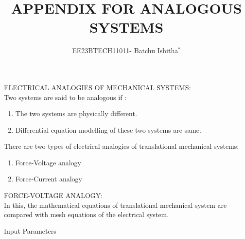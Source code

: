 \documentclass[journal,12pt,onecolumn]{IEEEtran}
\theoremstyle{remark}
\begin{document}
\newcommand\tabref{Table~\ref}
\newcommand{\sinc}{\,\text{sinc}\,}
\newcommand{\rect}{\,\text{rect}\,}

\let\vec\mathbf



\title{ APPENDIX FOR ANALOGOUS SYSTEMS}
\author{EE23BTECH11011- Batchu Ishitha$^{*}$%
}
\maketitle




\bigskip

\renewcommand{\thefigure}{\theenumi}
\renewcommand{\thetable}{\theenumi}

ELECTRICAL ANALOGIES OF MECHANICAL SYSTEMS:\\

Two systems are said to be analogous if :
\begin{enumerate}
\item The two systems are physically different.
\item Differential equation modelling of these two systems are same.
\end{enumerate} 


There are two types of electrical analogies of translational mechanical systems:
\begin{enumerate}
\item Force-Voltage analogy
\item Force-Current analogy
\end{enumerate} 

FORCE-VOLTAGE ANALOGY:\\
In this, the mathematical equations of translational mechanical system are compared with mesh equations of the electrical system.


\begin{table}[!ht]    
    \centering
      
      \caption{Input Parameters}
    \label{table:ishitha.g22.nm.54.at1}
\end{table}
\end{document}
